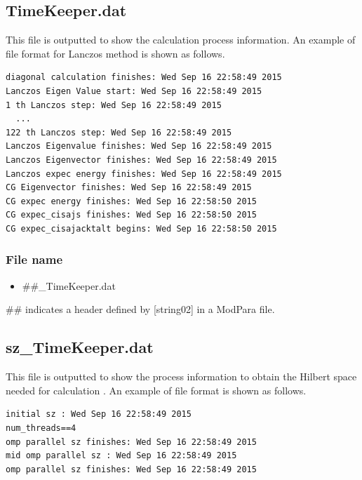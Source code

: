 \newpage
\subsection{TimeKeeper.dat}
This file is outputted to show the calculation process information.
An example of file format for Lanczos method is shown as follows.

\begin{minipage}{12.5cm}
\begin{screen}
\begin{verbatim}
diagonal calculation finishes: Wed Sep 16 22:58:49 2015
Lanczos Eigen Value start: Wed Sep 16 22:58:49 2015
1 th Lanczos step: Wed Sep 16 22:58:49 2015
  ...
122 th Lanczos step: Wed Sep 16 22:58:49 2015
Lanczos Eigenvalue finishes: Wed Sep 16 22:58:49 2015
Lanczos Eigenvector finishes: Wed Sep 16 22:58:49 2015
Lanczos expec energy finishes: Wed Sep 16 22:58:49 2015
CG Eigenvector finishes: Wed Sep 16 22:58:49 2015
CG expec energy finishes: Wed Sep 16 22:58:50 2015
CG expec_cisajs finishes: Wed Sep 16 22:58:50 2015
CG expec_cisajacktalt begins: Wed Sep 16 22:58:50 2015
\end{verbatim}
\end{screen}
\end{minipage}

\subsubsection{File name}
 \begin{itemize}
   \item  \#\#\_TimeKeeper.dat
  \end{itemize}
  \#\# indicates a header defined by [string02] in a ModPara file.

\subsection{sz\_TimeKeeper.dat}
This file is outputted to show the process information to obtain the Hilbert space needed for calculation .
An example of file format is shown as follows.

\begin{minipage}{12.5cm}
\begin{screen}
\begin{verbatim}
initial sz : Wed Sep 16 22:58:49 2015
num_threads==4
omp parallel sz finishes: Wed Sep 16 22:58:49 2015
mid omp parallel sz : Wed Sep 16 22:58:49 2015
omp parallel sz finishes: Wed Sep 16 22:58:49 2015
\end{verbatim}
\end{screen}
\end{minipage}

